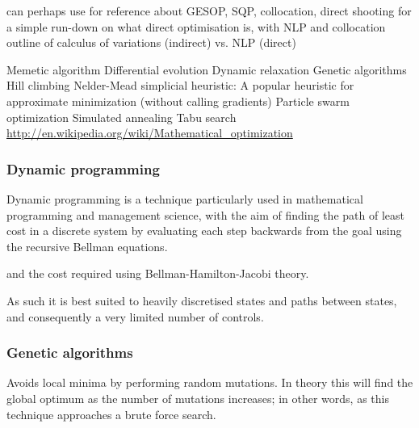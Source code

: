 \cite{Betts2002}

\textcite{SOCS_guide}

\textcite{ASTOS_guide}

can perhaps use \cite{Well2001} for reference about GESOP, SQP, collocation, direct shooting
\cite{Hargraves1987} for a simple run-down on what direct optimisation is, with NLP and collocation
\textcite{Enright1992} outline of calculus of variations (indirect) vs. NLP (direct)

Memetic algorithm
Differential evolution
Dynamic relaxation
Genetic algorithms
Hill climbing
Nelder-Mead simplicial heuristic: A popular heuristic for approximate minimization (without calling gradients)
Particle swarm optimization
Simulated annealing
Tabu search
\url{http://en.wikipedia.org/wiki/Mathematical_optimization}

\cite{Hughes2004}
\cite{Vasile2009}

\subsubsection{Dynamic programming}

Dynamic programming is a technique particularly used in mathematical programming and management science, with the aim of finding the path of least cost in a discrete system by evaluating each step backwards from the goal using the recursive Bellman equations. 

and the cost required using Bellman-Hamilton-Jacobi theory. 

As such it is best suited to heavily discretised states and paths between states, and consequently a very limited number of controls.

\subsubsection{Genetic algorithms}

Avoids local minima by performing random mutations. In theory this will find the global optimum as the number of mutations increases; in other words, as this technique approaches a brute force search.

